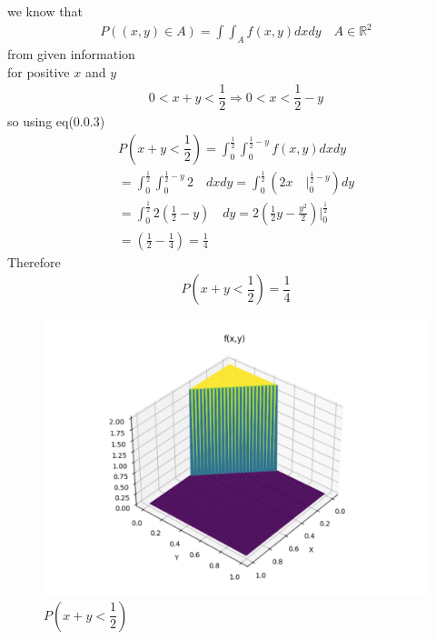 \documentclass[journal,12pt,twocolumn]{IEEEtran}
\begin{document}
we know that
\begin{align}
    P\left(\left(x,y\right)\in A\right)=\int \int _{A}f\left(x,y\right) dx dy \quad  A \in \mathbb{R}^2
\end{align}
from given information\\
for positive $x$ and $y$
\begin{align}
    0<x+y<\dfrac{1}{2}  \Rightarrow 0<x<\dfrac{1}{2}-y
\end{align}
so using eq(0.0.3)
\begin{align}
    P\left(x+y < \dfrac{1}{2}\right)=\int_{0}^{\frac{1}{2}} \int _{0}^{\frac{1}{2}-y}f(x,y) dx dy\\
    =\int_{0}^{\frac{1}{2}} \int _{0}^{\frac{1}{2}-y} 2 \quad dx dy
    =\int_{0}^{\frac{1}{2}} \left(  2 x \quad \big|_{0}^{\frac{1}{2}-y} \right)  dy\\
    =\int_{0}^{\frac{1}{2}}   2 \left(\frac{1}{2}-y\right) \quad    dy
    =2\left( \frac{1}{2} y - \frac{y^2}{2}  \right) \big|_{0}^{\frac{1}{2}}\\
    = \left( \frac{1}{2} - \frac{1}{4}\right) = \frac{1}{4} 
\end{align}
Therefore 
\begin{align}
    P\left(x+y<\dfrac{1}{2}\right)=\dfrac{1}{4}
\end{align}
\begin{figure}[h]
    \centering
    \includegraphics[scale=0.2]{P(x+y_2)_graph.png}
    \caption{$P\left(x+y<\dfrac{1}{2}\right)$}
    \label{fig:p(x+y<1/2)}
\end{figure}
\end{document}
